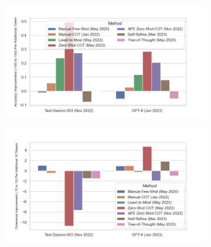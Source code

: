 \documentclass{beamer}
\begin{document}
\begin{frame}
\begin{figure}[h]
            \begin{subfigure}[h]{0.4925\textwidth}
                \centering
                \includegraphics[width=1.1\hsize]{../Output/gsm8k_change_in_accuracy_quality_per_change_in_conversation_length_sorted_by_technique_age.png} 
            \end{subfigure}
            \hfill
            \begin{subfigure}[h]{0.4925\textwidth}
                \centering
                \includegraphics[width=1.1\hsize]{../Output/cw_change_in_accuracy_quality_per_change_in_conversation_length_sorted_by_technique_age_transformed.png}
            \end{subfigure}

        \end{figure}

    \end{frame}
\end{document}

